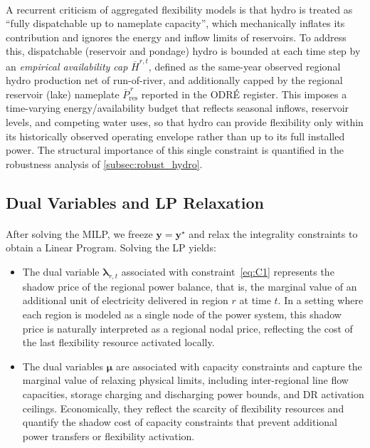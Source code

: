 \documentclass[12pt]{article}
\begin{document}
\paragraph{}
A recurrent criticism of aggregated flexibility models is that hydro is treated as ``fully dispatchable up to nameplate capacity'', which mechanically inflates its contribution and ignores the energy and inflow limits of reservoirs. To address this, dispatchable (reservoir and pondage) hydro is bounded at each time step by an \emph{empirical availability cap} $\overline{H}^{r,t}$, defined as the same-year observed regional hydro production net of run-of-river, and additionally capped by the regional reservoir (lake) nameplate $\overline{P}^{\,r}_{\text{res}}$ reported in the ODR\'E register. This imposes a time-varying energy/availability budget that reflects seasonal inflows, reservoir levels, and competing water uses, so that hydro can provide flexibility only within its historically observed operating envelope rather than up to its full installed power. The structural importance of this single constraint is quantified in the robustness analysis of \cref{subsec:robust_hydro}.

\subsection{Dual Variables and LP Relaxation}

\paragraph{}
After solving the MILP, we freeze $\mathbf{y} = \mathbf{y}^\star$ and relax the integrality constraints to obtain a Linear Program. Solving the LP yields:

\begin{itemize}
  \item The dual variable $\boldsymbol{\lambda}_{r,t}$ associated with constraint~\eqref{eq:C1} represents the shadow price of the regional power balance, that is, the marginal value of an additional unit of electricity delivered in region $r$ at time $t$. In a setting where each region is modeled as a single node of the power system, this shadow price is naturally interpreted as a regional nodal price, reflecting the cost of the last flexibility resource activated locally.

  \item The dual variables $\boldsymbol{\mu}$ are associated with capacity constraints and capture the marginal value of relaxing physical limits, including inter-regional line flow capacities, storage charging and discharging power bounds, and DR activation ceilings. Economically, they reflect the scarcity of flexibility resources and quantify the shadow cost of capacity constraints that prevent additional power transfers or flexibility activation.

\end{itemize}
\end{document}
